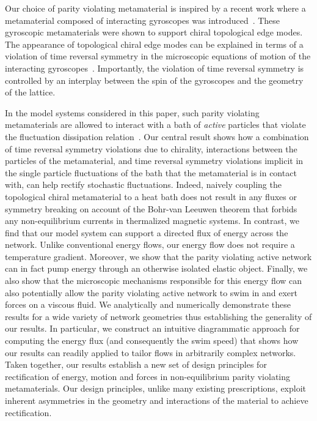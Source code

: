 \documentclass[
 preprint,
 preprintnumbers,
 amsmath,amssymb,
 aps,
 pre,
 longbibliography,
 superscriptaddress,
 10pt, twocolumn
]{revtex4-1}
\begin{document}
Our choice of parity violating metamaterial is inspired by a recent work where a metamaterial composed of interacting gyroscopes was introduced~\cite{Nash2015TopologicalMechanics}. These gyroscopic metamaterials were shown to support chiral topological edge modes. The appearance of topological chiral edge modes can be explained in terms of a violation of time reversal symmetry in the microscopic equations of motion of the interacting gyroscopes~\cite{Nash2015TopologicalMechanics,Mitchell2018AmorphousTopological}. Importantly, the violation of time reversal symmetry is controlled by an interplay between the spin of the gyroscopes and the geometry of the lattice.  %


In the model systems considered in this paper, such parity violating metamaterials are allowed to interact with a bath of \textit{active} particles that violate the fluctuation dissipation relation~\cite{Fodor2016HowFar}. Our central result shows how a combination of time reversal symmetry violations due to chirality, interactions between the particles of the metamaterial, and time reversal symmetry violations implicit in the single particle fluctuations of the bath that the metamaterial is in contact with, can help rectify stochastic fluctuations. Indeed, naively coupling the topological chiral metamaterial to a heat bath does not result in any fluxes or symmetry breaking on account of the Bohr-van Leeuwen theorem \cite{Pradhan2010NonexistenceClassical} that forbids any non-equilibrium currents in thermalized magnetic systems. In contrast, we find that our model system can support a directed flux of energy across the network. Unlike conventional energy flows, our energy flow does not require a temperature gradient. Moreover, we show that the {parity violating active} network can in fact pump energy through an otherwise isolated elastic object. Finally, we also show that the microscopic mechanisms responsible for this energy flow can also potentially allow the {parity violating active} network to swim in and exert forces on a viscous fluid. We analytically and numerically demonstrate these results for a wide variety of network geometries thus establishing the generality of our results. In particular, we construct an intuitive diagrammatic approach for computing the energy flux (and consequently the swim speed) that shows how our results can readily applied to tailor flows in arbitrarily complex networks. Taken together, our results establish a new set of design principles for rectification of energy, motion and forces in non-equilibrium parity violating metamaterials. Our design principles, unlike many existing prescriptions, exploit inherent asymmetries in the geometry and interactions of the material to achieve rectification.
\end{document}
